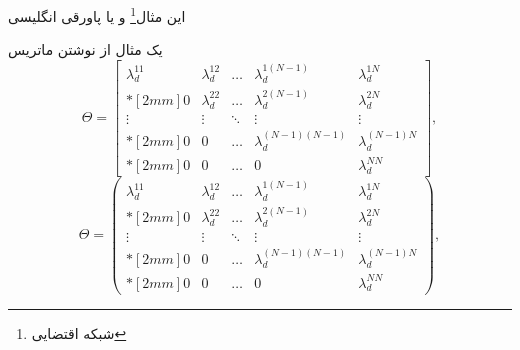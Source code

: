 \documentclass{report}
\begin{document}
این مثال\footnote{شبکه اقتضایی} و یا پاورقی انگلیسی

یک مثال از نوشتن ماتریس
\begin{equation}
\Theta =\begin{bmatrix}
\lambda_{d}^{11} & \lambda_{d}^{12} & \ldots & \lambda_{d}^{1(N-1)} & \lambda_{d}^{1N} \\*[2mm]
0 & \lambda_{d}^{22}  & \ldots & \lambda_{d}^{2(N-1)} & \lambda_{d}^{2N} \\
\vdots & \vdots  & \ddots & \vdots & \vdots\\*[2mm]
0 & 0 &  \ldots & \lambda_{d}^{(N-1)(N-1)} & \lambda_{d}^{(N-1)N}\\*[2mm]
0 & 0 &  \ldots & 0 & \lambda_{d}^{NN}
\end{bmatrix},
\label{wqlsdskdksds}
\end{equation}
\begin{equation}
\Theta =\begin{pmatrix}
\lambda_{d}^{11} & \lambda_{d}^{12} & \ldots & \lambda_{d}^{1(N-1)} & \lambda_{d}^{1N} \\*[2mm]
0 & \lambda_{d}^{22}  & \ldots & \lambda_{d}^{2(N-1)} & \lambda_{d}^{2N} \\
\vdots & \vdots  & \ddots & \vdots & \vdots\\*[2mm]
0 & 0 &  \ldots & \lambda_{d}^{(N-1)(N-1)} & \lambda_{d}^{(N-1)N}\\*[2mm]
0 & 0 &  \ldots & 0 & \lambda_{d}^{NN}
\end{pmatrix},
\label{wqlsdskdksds}
\end{equation}
	
\end{document}
